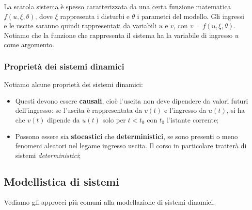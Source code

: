 \documentclass[a4paper,11pt]{article}
\begin{document}
\begin{center}
\end{center} 

La scatola sistema è spesso caratterizzata da una certa funzione matematica $f(u, \xi, \theta)$, dove $\xi$ rappresenta i disturbi e $\theta$ i parametri del modello.
Gli ingressi e le uscite saranno quindi rappresentati da variabili $u$ e $v$, con $v = f(u, \xi, \theta)$. 
Notiamo che la funzione che rappresenta il sistema ha la variabile di ingresso $u$ come argomento.

\begin{center}
\end{center}


\subsubsection{Proprietà dei sistemi dinamici}
Notiamo alcune proprietà dei sistemi dinamici:
\begin{itemize}
	\item Questi devono essere \textbf{causali}, cioè l'uscita non deve dipendere da valori futuri dell'ingresso: se l'uscita è rappresentata da $v(t)$ e l'ingresso da $u(t)$, si ha che $v(t)$ dipende da $u(t)$ solo per $t < t_0$ con $t_0$ l'istante corrente;
	\item Possono essere sia \textbf{stocastici} che \textbf{deterministici}, se sono presenti o meno fenomeni aleatori nel legame ingresso uscita. Il corso in particolare tratterà di sistemi \textit{deterministici};
\end{itemize}

\subsection{Modellistica di sistemi}
Vediamo gli approcci più comuni alla modellazione di sistemi dinamici.
\end{document}
